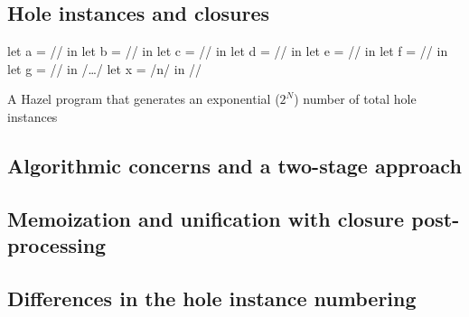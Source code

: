 \subsection{Hole instances and closures}
\label{sec:hole_instances_and_closures}

\begin{listing}
  \centering
  \begin{hminted}
let a = // in
let b = // in
let c = // in
let d = // in
let e = // in
let f = // in
let g = // in
/\dots/
let x = /\heh n/ in
//
  \end{hminted}
  \caption{A Hazel program that generates an exponential ($2^N$) number of total hole instances}
  \label{fig:hole_renumbering_problem}
\end{listing}

\subsection{Algorithmic concerns and a two-stage approach}
\label{sec:two-stage-renumber}

\subsection{Memoization and unification with closure post-processing}
\label{sec:renumbering_memoization}

\subsection{Differences in the hole instance numbering}
\label{sec:differences_numbering}


